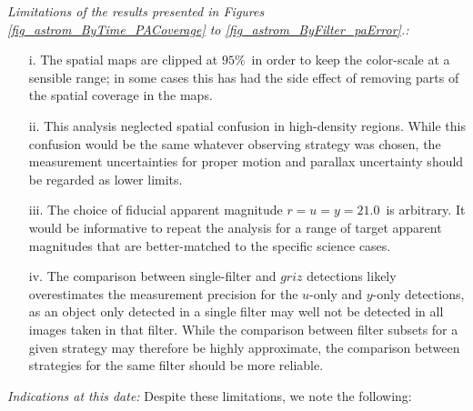 {\it Limitations of the results presented in Figures \ref{fig_astrom_ByTime_PACoverage} to \ref{fig_astrom_ByFilter_paError}.:}
\begin{itemize}
  \item[i.] The spatial maps are clipped at $95\%$~in order to keep
    the color-scale at a sensible range; in some cases this has had
    the side effect of removing parts of the spatial coverage in the
     maps.

  \item[ii.] This analysis neglected spatial confusion in high-density regions. While this
    confusion would be the same whatever observing strategy was
    chosen, the measurement uncertainties for proper motion and parallax uncertainty
    should be regarded as lower limits.

    \item[iii.] The choice of fiducial apparent magnitude $r = u = y =
      21.0$~is arbitrary. It
      would be informative to repeat the analysis for a range of
      target apparent magnitudes that are better-matched to the
      specific science cases.

      \item[iv.] The comparison between single-filter and $griz$
        detections likely overestimates the measurement precision for
        the $u$-only and $y$-only detections, as an object only
        detected in a single filter may well not be detected in all
        images taken in that filter. While the comparison between
        filter subsets for a given strategy may therefore be highly
        approximate, the comparison between strategies for the same
        filter should be more reliable.



\end{itemize}

{\it Indications at this date:} Despite these limitations, we note the following:

